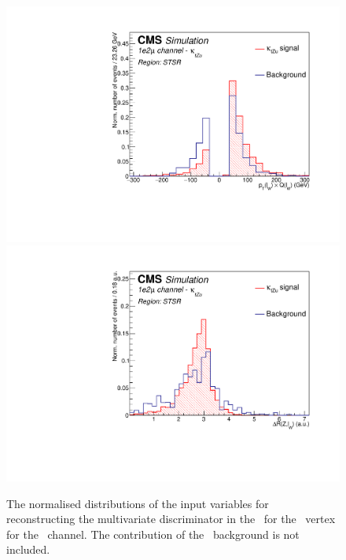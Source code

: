 \begin{figure}[htbp]
	\includegraphics[width=0.3\linewidth]{6_Search/Figures/PlotsTechnics/ptWQZutsingletopuue_norm}
	\includegraphics[width=0.3\linewidth]{6_Search/Figures/PlotsTechnics/dRZWlepZutsingletopuue_norm}
	\caption{The normalised distributions of the input variables for reconstructing the multivariate discriminator in the \STSR\ for the \Zut\ vertex for the \emumu\ channel. The contribution of the \NPL\ background is not included. }
	\label{fig:singletopZutnormalizeduue}
\end{figure}


